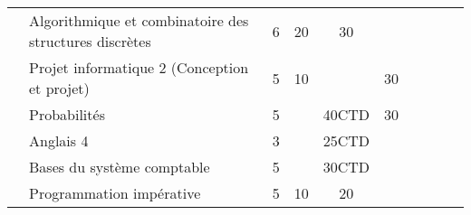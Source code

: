 \documentclass[10pt, a5paper]{report}
\begin{document}
\begin{tabular}{c|m{6cm}|cm{1cm}|cm{1cm}|cm{1cm}|cm{1cm}|}
 & \color{black} \mbox{Algorithmique} \mbox{et} \mbox{combinatoire} \mbox{des} \mbox{structures} \mbox{discrètes}  & \color{black} 6 & \color{black} 20 & \color{black} 30 & \color{black}  \\ \cline{2-6}
 & \cellcolor{couleurClaire} \color{couleurTexte} \mbox{Projet} \mbox{informatique} \mbox{2} \mbox{(Conception} \mbox{et} \mbox{projet)}  & \cellcolor{couleurClaire} \color{couleurTexte} 5 & \cellcolor{couleurClaire} \color{couleurTexte} 10 & \cellcolor{couleurClaire} \color{couleurTexte}  & \cellcolor{couleurClaire} \color{couleurTexte} 30 \\ \cline{2-6}
 & \color{black} \mbox{Probabilités}  & \color{black} 5 & \color{black}  & \color{black} 40CTD & \color{black} 30 \\ \cline{2-6}
 & \cellcolor{couleurClaire} \color{couleurTexte} \mbox{Anglais} \mbox{4}  & \cellcolor{couleurClaire} \color{couleurTexte} 3 & \cellcolor{couleurClaire} \color{couleurTexte}  & \cellcolor{couleurClaire} \color{couleurTexte} 25CTD & \cellcolor{couleurClaire} \color{couleurTexte}  \\ \cline{2-6}
 & \color{black} \mbox{Bases} \mbox{du} \mbox{système} \mbox{comptable}  & \color{black} 5 & \color{black}  & \color{black} 30CTD & \color{black}  \\ \cline{2-6}
 & \cellcolor{couleurClaire} \color{couleurTexte} \mbox{Programmation} \mbox{impérative}  & \cellcolor{couleurClaire} \color{couleurTexte} 5 & \cellcolor{couleurClaire} \color{couleurTexte} 10 & \cellcolor{couleurClaire} \color{couleurTexte} 20 & \cellcolor{couleurClaire} \color{couleurTexte}  \\ \cline{2-6}
\hline
\end{tabular}


 
\end{document}
